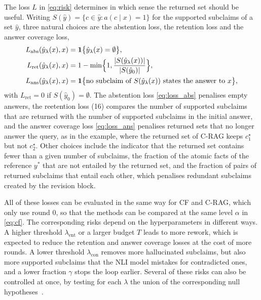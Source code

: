 The loss $L$ in \eqref{eq:risk} determines in which sense the returned set should be useful. Writing $S(\hat{y}) = \{ c \in \hat{y} : a(c \mid x) = 1 \}$ for the supported subclaims of a set $\hat{y}$, three natural choices are the abstention loss, the retention loss and the answer coverage loss,
\begin{align}
  L_{\mathrm{abs}}(\hat{y}_{\lambda}(x), x) &= \mathbf{1}\bigl\{ \hat{y}_{\lambda}(x) = \emptyset \bigr\}, \label{eq:loss_abs} \\
  L_{\mathrm{ret}}(\hat{y}_{\lambda}(x), x) &= 1 - \min\Bigl\{ 1, \frac{|S(\hat{y}_{\lambda}(x))|}{|S(\hat{y}_0)|} \Bigr\}, \label{eq:loss_ret} \\
  L_{\mathrm{ans}}(\hat{y}_{\lambda}(x), x) &= \mathbf{1}\bigl\{ \text{no subclaim of } S(\hat{y}_{\lambda}(x)) \text{ states the answer to } x \bigr\}, \label{eq:loss_ans}
\end{align}
with $L_{\mathrm{ret}} = 0$ if $S(\hat{y}_0) = \emptyset$. The abstention loss \eqref{eq:loss_abs} penalises empty answers, the reetention loss (16) compares the number of supported subclaims that are returned with the number of supported subclaims in the initial answer, and the answer coverage loss \eqref{eq:loss_ans} penalises returned sets that no longer answer the query, as in the example, where the returned set of C-RAG keeps $c^{\star}_1$ but not $c^{\star}_2$. Other choices include the indicator that the returned set contains fewer than a given number of subclaims, the fraction of the atomic facts of the reference $y^*$ that are not entailed by the returned set, and the fraction of pairs of returned subclaims that entail each other, which penalises redundant subclaims created by the revision block.
 
All of these losses can be evaluated in the same way for CF and C-RAG, which only use round $0$, so that the methods can be compared at the same level $\alpha$ in \eqref{eq:cf}. The corresponding risks depend on the hyperparameters in different ways. A higher threshold $\lambda_{\mathrm{ent}}$ or a larger budget $T$ leads to more rework, which is expected to reduce the retention and answer coverage losses at the cost of more rounds. A lower threshold $\lambda_{\mathrm{con}}$ removes more hallucinated subclaims, but also more supported subclaims that the NLI model mistakes for contradicted ones, and a lower fraction $\gamma$ stops the loop earlier. Several of these risks can also be controlled at once, by testing for each $\lambda$ the union of the corresponding null hypotheses~\cite{angelopoulos2021learn}.


